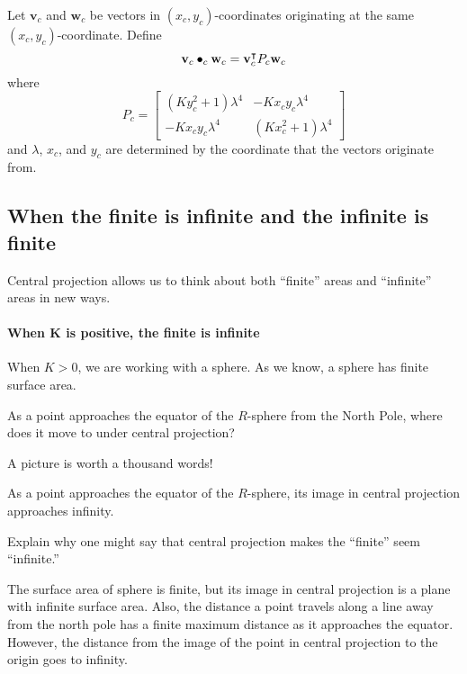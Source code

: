 \documentclass[newpage,hints,handout,12pt,noauthor,nooutcomes]{ximera}
\begin{document}
\begin{definition}
  Let $\mathbf{v}_c$ and $\mathbf{w}_c$ be vectors in $(x_c,y_c)$-coordinates
  originating at the same $(x_c,y_c)$-coordinate. Define
  \[
  \mathbf{v}_c \bullet_c \mathbf{w}_c = \mathbf{v}_c^\intercal P_c \mathbf{w}_c
  \]
  where
  \[
  P_c =
  \begin{bmatrix}
    \left(Ky_c^2+1\right)\lambda^4 & -Kx_{c}y_{c}\lambda^4\\
    -Kx_{c}y_{c}\lambda^4 & \left(Kx_c^2+1\right)\lambda^4
  \end{bmatrix}
  \]
  and $\lambda$, $x_c$, and $y_c$ are determined by the
  coordinate that the vectors originate from.
\end{definition}


\subsection{When the finite is infinite and the infinite is finite}

Central projection allows us to think about both ``finite'' areas and
``infinite'' areas in new ways.

\paragraph{When $\boldsymbol K$ is positive, the finite is infinite}

When $K>0$, we are working with a sphere. As we know, a sphere has
finite surface area.

\begin{problem}
  As a point approaches the equator of the $R$-sphere from the North
  Pole, where does it move to under central projection?
  \begin{hint}
    A picture is worth a thousand words!
  \end{hint}
  \begin{freeResponse}
  As a point approaches the equator of the $R$-sphere, its image in central projection approaches infinity. 
  \end{freeResponse}
\end{problem}

\begin{problem}
  Explain why one might say that central projection makes the
  ``finite'' seem ``infinite.''
    \begin{freeResponse}
    The surface area of sphere is finite, but its image in central projection is a plane with infinite surface area. Also, the distance a point travels along a line away from the north pole has a finite maximum distance as it approaches the equator. However, the distance from the image of the point in central projection to the origin goes to infinity. 
    \end{freeResponse}
\end{problem}
\end{document}
